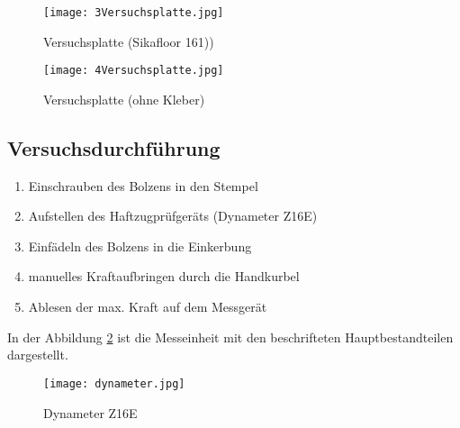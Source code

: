 \documentclass[12 pt,a4 paper ]{scrreprt}
\begin{document}
\begin{figure}[h]
\begin{minipage}[hbt]{7cm}	
	\texttt{[image: 3Versuchsplatte.jpg]}
	\caption{Versuchsplatte (Sikafloor 161))}
	\label{3Versuchsplatte}
\end{minipage}
\hfill
\begin{minipage}[hbt]{7cm}
	\texttt{[image: 4Versuchsplatte.jpg]}
	\caption{Versuchsplatte (ohne Kleber)}
	\label{4Versuchsplatte}
\end{minipage}
\end{figure}

\subsection{Versuchsdurchführung}

\begin{enumerate}
\item Einschrauben des Bolzens in den Stempel
\item Aufstellen des Haftzugprüfgeräts (Dynameter Z16E)
\item Einfädeln des Bolzens in die Einkerbung
\item manuelles Kraftaufbringen durch die Handkurbel
\item Ablesen der max. Kraft auf dem Messgerät
\end{enumerate}

In der Abbildung \ref{dynameter} ist die Messeinheit mit den beschrifteten Hauptbestandteilen dargestellt. 

\begin{figure}
\begin{center}
\texttt{[image: dynameter.jpg]}
\caption{ Dynameter Z16E}
\label{dynameter}
\end{center}
\end{figure}
\end{document}
